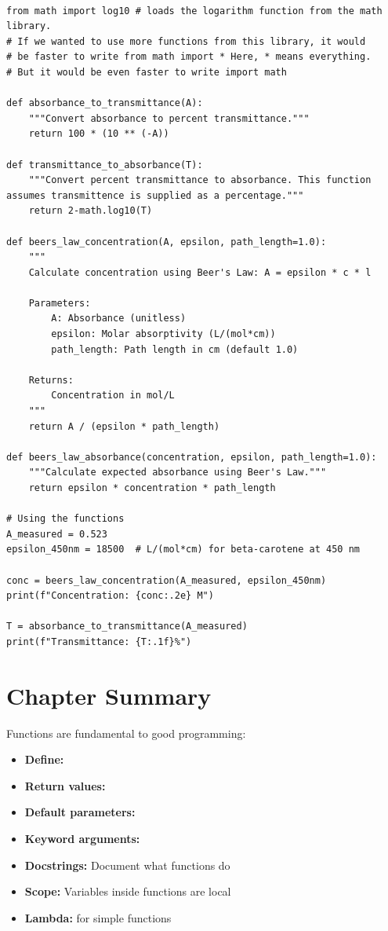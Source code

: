 \begin{lstlisting}

from math import log10 # loads the logarithm function from the math library. 
# If we wanted to use more functions from this library, it would 
# be faster to write from math import * Here, * means everything. 
# But it would be even faster to write import math

def absorbance_to_transmittance(A):
    """Convert absorbance to percent transmittance."""
    return 100 * (10 ** (-A))

def transmittance_to_absorbance(T):
    """Convert percent transmittance to absorbance. This function assumes transmittence is supplied as a percentage."""
    return 2-math.log10(T)

def beers_law_concentration(A, epsilon, path_length=1.0):
    """
    Calculate concentration using Beer's Law: A = epsilon * c * l

    Parameters:
        A: Absorbance (unitless)
        epsilon: Molar absorptivity (L/(mol*cm))
        path_length: Path length in cm (default 1.0)

    Returns:
        Concentration in mol/L
    """
    return A / (epsilon * path_length)

def beers_law_absorbance(concentration, epsilon, path_length=1.0):
    """Calculate expected absorbance using Beer's Law."""
    return epsilon * concentration * path_length

# Using the functions
A_measured = 0.523
epsilon_450nm = 18500  # L/(mol*cm) for beta-carotene at 450 nm

conc = beers_law_concentration(A_measured, epsilon_450nm)
print(f"Concentration: {conc:.2e} M")

T = absorbance_to_transmittance(A_measured)
print(f"Transmittance: {T:.1f}%")
\end{lstlisting}

\section{Chapter Summary}
\label{sec:functions-summary}

Functions are fundamental to good programming:

\begin{itemize}
    \item \textbf{Define:} 
    \item \textbf{Return values:} 
    \item \textbf{Default parameters:} 
    \item \textbf{Keyword arguments:} 
    \item \textbf{Docstrings:} Document what functions do
    \item \textbf{Scope:} Variables inside functions are local
    \item \textbf{Lambda:}  for simple functions
\end{itemize}

